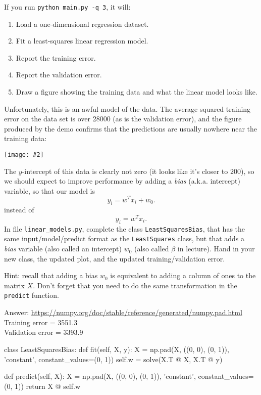 \documentclass{article}
\newcommand{\blu}[1]{{\textcolor{blu}{#1}}}
\newenvironment{answer}{\par\begingroup\color{gre}Answer: }{\endgroup}
\let\ask\blu
\newcommand{\centerfig}[2]{\begin{center}\texttt{[image: \#2]}\end{center}}
\begin{document}
\label{biasvar}
If you run  \verb|python main.py -q 3|, it will:
\begin{enumerate}
\item Load a one-dimensional regression dataset.
\item Fit a least-squares linear regression model.
\item Report the training error.
\item Report the validation error.
\item Draw a figure showing the training data and what the linear model looks like.
\end{enumerate}
Unfortunately, this is an awful model of the data. The average squared training error on the data set is over 28000
(as is the validation error), and the figure produced by the demo confirms that the predictions are usually nowhere near
 the training data:
\centerfig{.5}{./figs/least_squares_no_bias.pdf}
The $y$-intercept of this data is clearly not zero (it looks like it's closer to $200$),
so we should expect to improve performance by adding a \emph{bias} (a.k.a. intercept) variable, so that our model is
\[
y_i = w^Tx_i + w_0.
\]
instead of
\[
y_i = w^Tx_i.
\]
\ask{In file \texttt{linear\string_models.py}, complete the class \texttt{LeastSquaresBias},
that has the same input/model/predict format as the \texttt{LeastSquares} class,
but that adds a \emph{bias} variable (also called an intercept) $w_0$ (also called $\beta$ in lecture). Hand in your new class, the updated plot,
and the updated training/validation error.}

Hint: recall that adding a bias $w_0$ is equivalent to adding a column of ones to the matrix $X$. Don't forget that you need to do the same transformation in the \texttt{predict} function.

\begin{answer}
    \url{https://numpy.org/doc/stable/reference/generated/numpy.pad.html}\\
    Training error = 3551.3\\
    Validation error = 3393.9
\end{answer}

\begin{python}
class LeastSquaresBias:
    def fit(self, X, y):
        X = np.pad(X, ((0, 0), (0, 1)), 'constant', constant_values=(0, 1))
        self.w = solve(X.T @ X, X.T @ y)

    def predict(self, X):
        X = np.pad(X, ((0, 0), (0, 1)), 'constant', constant_values=(0, 1))
        return X @ self.w
\end{python}
\end{document}
